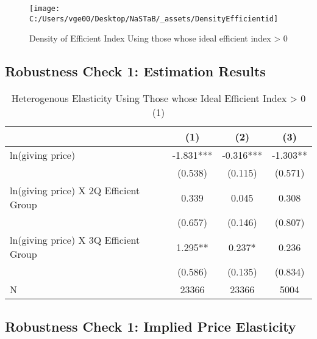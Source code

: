 \documentclass[ review  , 3p ]{elsarticle}
\begin{document}
  \begin{figure}
  
  {\centering \texttt{[image: C:/Users/vge00/Desktop/NaSTaB/\_assets/DensityEfficientid]} 
  
  }
  
  \caption{Density of Efficient Index Using those whose ideal efficient index > 0}\label{fig:unnamed-chunk-2}
  \end{figure}
  
  \hypertarget{robustness-check-1-estimation-results}{%
  \subsection{Robustness Check 1: Estimation Results}\label{robustness-check-1-estimation-results}}
  
  \begin{table}
  
  \caption{\label{tab:kableSubsetHeteroElasticitySlide1}Heterogenous Elasticity Using Those whose Ideal Efficient Index > 0 (1)}
  \centering
  \fontsize{8}{10}\selectfont
  \begin{tabular}[t]{lccc}
  \toprule
   & (1) & (2) & (3)\\
  \midrule
  ln(giving price) & -1.831*** & -0.316*** & -1.303**\\
   & (0.538) & (0.115) & (0.571)\\
  ln(giving price) X 2Q Efficient Group & 0.339 & 0.045 & 0.308\\
   & (0.657) & (0.146) & (0.807)\\
  ln(giving price) X 3Q Efficient Group & 1.295** & 0.237* & 0.236\\
   & (0.586) & (0.135) & (0.834)\\
  N & 23366 & 23366 & 5004\\
  \bottomrule
  \end{tabular}
  \end{table}
  
  \hypertarget{robustness-check-1-implied-price-elasticity}{%
  \subsection{Robustness Check 1: Implied Price Elasticity}\label{robustness-check-1-implied-price-elasticity}}
  
\end{document}
